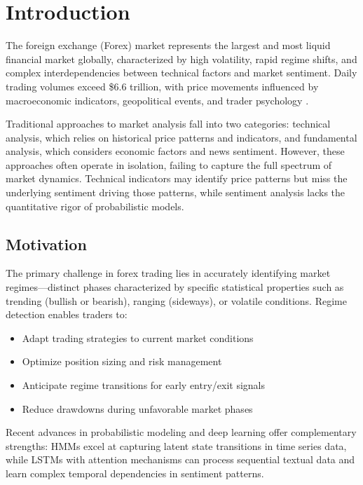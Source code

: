 \documentclass[conference]{IEEEtran}
\begin{document}
\section{Introduction}
The foreign exchange (Forex) market represents the largest and most liquid financial market globally, characterized by high volatility, rapid regime shifts, and complex interdependencies between technical factors and market sentiment. Daily trading volumes exceed \$6.6 trillion, with price movements influenced by macroeconomic indicators, geopolitical events, and trader psychology \cite{bis2022}. 

Traditional approaches to market analysis fall into two categories: technical analysis, which relies on historical price patterns and indicators, and fundamental analysis, which considers economic factors and news sentiment. However, these approaches often operate in isolation, failing to capture the full spectrum of market dynamics. Technical indicators may identify price patterns but miss the underlying sentiment driving those patterns, while sentiment analysis lacks the quantitative rigor of probabilistic models.

\subsection{Motivation}
The primary challenge in forex trading lies in accurately identifying market regimes—distinct phases characterized by specific statistical properties such as trending (bullish or bearish), ranging (sideways), or volatile conditions. Regime detection enables traders to:
\begin{itemize}
\item Adapt trading strategies to current market conditions
\item Optimize position sizing and risk management
\item Anticipate regime transitions for early entry/exit signals
\item Reduce drawdowns during unfavorable market phases
\end{itemize}

Recent advances in probabilistic modeling and deep learning offer complementary strengths: HMMs excel at capturing latent state transitions in time series data, while LSTMs with attention mechanisms can process sequential textual data and learn complex temporal dependencies in sentiment patterns.
\end{document}
